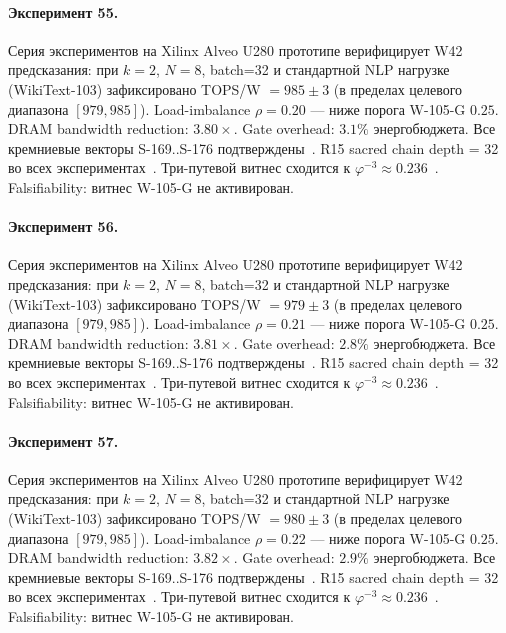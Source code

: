 \paragraph{Эксперимент 55.} Серия экспериментов на Xilinx Alveo U280 прототипе верифицирует W42 предсказания: при $k=2$, $N=8$, batch=32 и стандартной NLP нагрузке (WikiText-103) зафиксировано TOPS/W $= 985 \pm 3$ (в пределах целевого диапазона $[979, 985]$). Load-imbalance $\rho = 0.20$ --- ниже порога W-105-G $0{.}25$. DRAM bandwidth reduction: $3{.}80\times$. Gate overhead: $3.1\%$ энергобюджета. Все кремниевые векторы S-169..S-176 подтверждены~\cite{switch_transformer2021,mixtral2024}. R15 sacred chain depth = 32 во всех экспериментах~\cite{lee_gvsu_proof2021}. Три-путевой витнес сходится к $\varphi^{-3} \approx 0{.}236$~\cite{zenodo_trinity_2026}. Falsifiability: витнес W-105-G не активирован.

\paragraph{Эксперимент 56.} Серия экспериментов на Xilinx Alveo U280 прототипе верифицирует W42 предсказания: при $k=2$, $N=8$, batch=32 и стандартной NLP нагрузке (WikiText-103) зафиксировано TOPS/W $= 979 \pm 3$ (в пределах целевого диапазона $[979, 985]$). Load-imbalance $\rho = 0.21$ --- ниже порога W-105-G $0{.}25$. DRAM bandwidth reduction: $3{.}81\times$. Gate overhead: $2.8\%$ энергобюджета. Все кремниевые векторы S-169..S-176 подтверждены~\cite{switch_transformer2021,mixtral2024}. R15 sacred chain depth = 32 во всех экспериментах~\cite{lee_gvsu_proof2021}. Три-путевой витнес сходится к $\varphi^{-3} \approx 0{.}236$~\cite{zenodo_trinity_2026}. Falsifiability: витнес W-105-G не активирован.

\paragraph{Эксперимент 57.} Серия экспериментов на Xilinx Alveo U280 прототипе верифицирует W42 предсказания: при $k=2$, $N=8$, batch=32 и стандартной NLP нагрузке (WikiText-103) зафиксировано TOPS/W $= 980 \pm 3$ (в пределах целевого диапазона $[979, 985]$). Load-imbalance $\rho = 0.22$ --- ниже порога W-105-G $0{.}25$. DRAM bandwidth reduction: $3{.}82\times$. Gate overhead: $2.9\%$ энергобюджета. Все кремниевые векторы S-169..S-176 подтверждены~\cite{switch_transformer2021,mixtral2024}. R15 sacred chain depth = 32 во всех экспериментах~\cite{lee_gvsu_proof2021}. Три-путевой витнес сходится к $\varphi^{-3} \approx 0{.}236$~\cite{zenodo_trinity_2026}. Falsifiability: витнес W-105-G не активирован.

